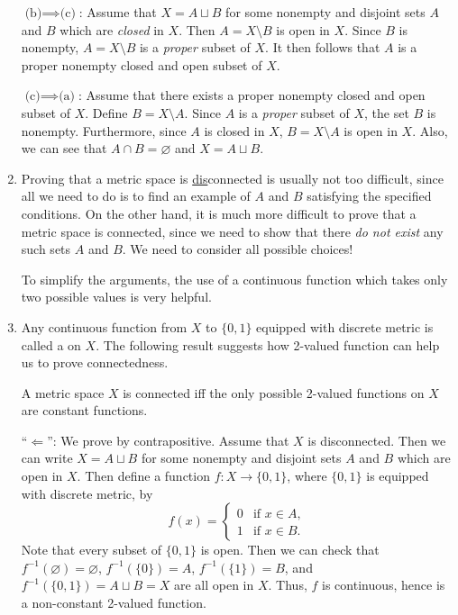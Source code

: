 \begin{enumerate}
\begin{pf}
\underline{\(\text{(b)}\implies \text{(c)}\)}: Assume that \(X=A\sqcup B\) for
some nonempty and disjoint sets \(A\) and \(B\) which are \emph{closed} in
\(X\). Then \(A=X\setminus B\) is open in \(X\). Since \(B\) is nonempty,
\(A=X\setminus B\) is a \emph{proper} subset of \(X\). It then follows that
\(A\) is a proper nonempty closed and open subset of \(X\).

\underline{\(\text{(c)}\implies \text{(a)}\)}: Assume that there exists a
proper nonempty closed and open subset of \(X\). Define \(B=X\setminus A\).
Since \(A\) is a \emph{proper} subset of \(X\), the set \(B\) is nonempty.
Furthermore, since \(A\) is closed in \(X\), \(B=X\setminus A\) is open in
\(X\). Also, we can see that \(A\cap B=\varnothing\) and \(X=A\sqcup B\).
\end{pf}

\item Proving that a metric space is \underline{dis}connected is usually not
too difficult, since all we need to do is to find an example of \(A\) and \(B\)
satisfying the specified conditions. On the other hand, it is much more
difficult to prove that a metric space is connected, since we need to show that
there \emph{do not exist} any such sets \(A\) and \(B\). We need to consider all
possible choices!

To simplify the arguments, the use of a continuous function which takes only
two possible values is very helpful.

\item Any continuous function from \(X\) to \(\{0,1\}\) equipped with discrete
metric is called a  on \(X\). The following result
suggests how 2-valued function can help us to prove connectedness.

\begin{theorem}
\label{thm:conn-2-val}
A metric space \(X\) is connected iff the only possible 2-valued functions on
\(X\) are constant functions.
\end{theorem}
\begin{pf}
``\(\Leftarrow\)'': We prove by contrapositive. Assume that \(X\) is
disconnected. Then we can write \(X=A\sqcup B\) for some nonempty and disjoint
sets \(A\) and \(B\) which are open in \(X\). Then define a function
\(f:X\to\{0,1\}\), where \(\{0,1\}\) is equipped with discrete metric, by
\[
f(x)=\begin{cases}
0&\text{if \(x\in A\)},\\
1&\text{if \(x\in B\)}.
\end{cases}
\]
Note that every subset of \(\{0,1\}\) is open.  Then we can check that
\(f^{-1}(\varnothing)=\varnothing\), \(f^{-1}(\{0\})=A\), \(f^{-1}(\{1\})=B\), and
\(f^{-1}(\{0,1\})=A\sqcup B=X\) are all open in \(X\). Thus, \(f\) is
continuous, hence is a non-constant 2-valued function.



\end{pf}
\end{enumerate}
